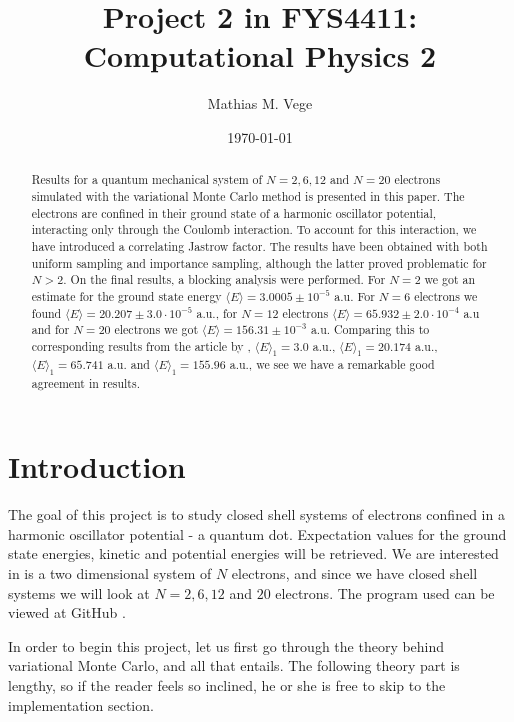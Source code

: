 \documentclass[11pt]{article}
\title{Project 2 in FYS4411: Computational Physics 2}
\author{Mathias M. Vege}
\date{\today}
\begin{document}
\maketitle

\begin{abstract}
Results for a quantum mechanical system of $N=2,6,12$ and $N=20$ electrons simulated with the variational Monte Carlo method is presented in this paper. The electrons are confined in their ground state of a harmonic oscillator potential, interacting only through the Coulomb interaction. To account for this interaction, we have introduced a correlating Jastrow factor. The results have been obtained with both uniform sampling and importance sampling, although the latter proved problematic for $N>2$. On the final results, a blocking analysis were performed. For $N=2$ we got an estimate for the ground state energy $\langle E\rangle=3.0005\pm10^{-5}$ a.u. For $N=6$ electrons we found $\langle E \rangle = 20.207\pm 3.0\cdot 10^{-5}$ a.u., for $N=12$ electrons $\langle E \rangle = 65.932\pm 2.0\cdot 10^{-4}$ a.u and for $N=20$ electrons we got $\langle E \rangle = 156.31\pm 10^{-3}$ a.u. Comparing this to corresponding results from the article by \citet{PhysRevB.84.115302}, $\langle E \rangle_1 = 3.0$ a.u., $\langle E \rangle_1 = 20.174$ a.u., $\langle E \rangle_1=65.741$ a.u. and $\langle E \rangle_1 = 155.96$ a.u., we see we have a remarkable good agreement in results.
\end{abstract}

\tableofcontents

\section{Introduction}
The goal of this project is to study closed shell systems of electrons confined in a harmonic oscillator potential - a quantum dot. Expectation values for the ground state energies, kinetic and potential energies will be retrieved. We are interested in is a two dimensional system of $N$ electrons, and since we have closed shell systems we will look at $N=2,6,12$ and $20$ electrons. The program used can be viewed at GitHub \cite{github}.

In order to begin this project, let us first go through the theory behind variational Monte Carlo, and all that entails. The following theory part is lengthy, so if the reader feels so inclined, he or she is free to skip to the implementation section.
\end{document}
